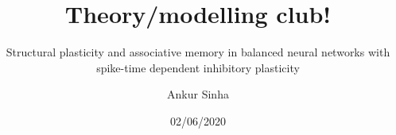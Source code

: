 
\usepackage{color}
\usepackage{tipa}
\usepackage[scale=2]{ccicons}
\usepackage{amssymb}
\usepackage{tikz}
\usetikzlibrary{mindmap, arrows.meta, positioning, arrows}
\usepackage{pgfplots}
\usepackage{jneurosci}
\usepackage{subcaption}
\usepackage[T1]{fontenc}
\usepackage[utf8]{inputenc}
\usepackage[style=nature,backend=biber,autocite=footnote]{biblatex}

\usepackage[sfdefault]{roboto}
\usepackage[normalem]{ulem}
\usepackage{hyperref}
\hypersetup{colorlinks,linkcolor=Green,urlcolor=links}
\usepackage{graphicx}
\usepackage{algorithmic}
\usepackage{textcomp}
\usepackage{wrapfig}
\usepackage{textgreek}
\usepackage{euler}
\usepackage{csquotes}
\usepackage{tabularx}
\usepackage{booktabs}


\renewcommand{\footnoterule}{}

\title{Theory/modelling club!}
\subtitle{Structural plasticity and associative memory in balanced neural networks with spike-time dependent inhibitory plasticity}
\author[Ankur Sinha]{Ankur Sinha}
\date{02/06/2020}




\begin{frame}
  \titlepage{}
\end{frame}

